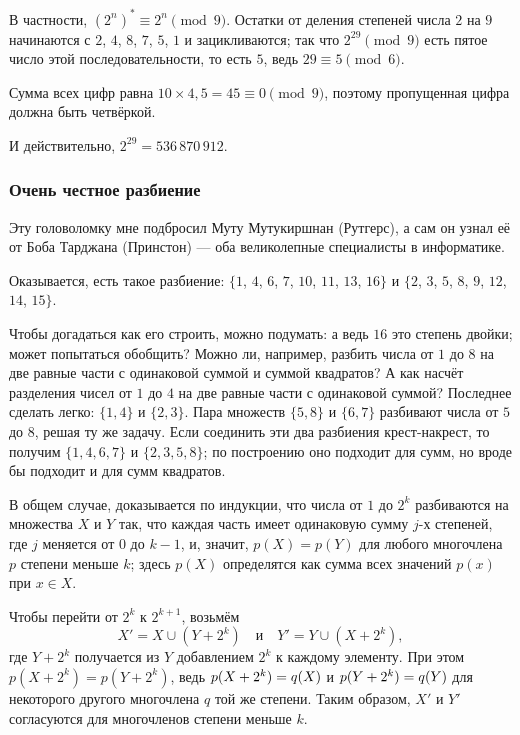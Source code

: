 В частности, $(2^n)^* \equiv 2^n \pmod 9$.
Остатки от деления степеней числа $2$ на $9$ начинаются с $2$, $4$, $8$, $7$, $5$, $1$ и зацикливаются;
так что $2^{29} \pmod 9$ есть пятое число этой последовательности, то есть $5$, ведь $29 \equiv 5 \pmod 6$.

Сумма всех цифр равна $10 \times 4{,}5 = 45 \equiv 0 \pmod 9$, поэтому пропущенная цифра должна быть четвёркой.

И действительно, $2^{29} = 536\,870\,912$.

\subsubsection*{Очень честное разбиение}

Эту головоломку мне подбросил Муту Мутукиршнан (Рутгерс),
а сам он узнал её от Боба Тарджана (Принстон) — 
оба великолепные специалисты в информатике.

Оказывается, есть такое разбиение: $\{1$, $4$, $6$, $7$, $10$, $11$, $13$, $16\}$ и $\{2$, $3$, $5$, $8$, $9$, $12$, $14$, $15\}$.

Чтобы догадаться как его строить, можно подумать:
а ведь $16$ это степень двойки;
может попытаться обобщить?
Можно ли, например, разбить числа от $1$ до $8$ на две равные части с одинаковой суммой и суммой квадратов?
А как насчёт разделения чисел от $1$ до $4$ на две равные части с одинаковой суммой?
Последнее сделать легко: $\{1, 4\}$ и $\{2, 3\}$.
Пара множеств $\{5, 8\}$ и $\{6, 7\}$ разбивают числа от $5$ до $8$, решая ту же задачу.
Если соединить эти два разбиения крест-накрест, то получим $\{1, 4, 6, 7\}$ и $\{2, 3, 5, 8\}$; по построению оно подходит для сумм, но вроде бы подходит и для сумм квадратов.

В общем случае, доказывается по индукции, что числа от $1$ до $2^k$ разбиваются на множества $X$ и $Y$ так, что каждая часть имеет одинаковую сумму $j$-х степеней, где $j$ меняется от $0$ до $k - 1$, и, значит, $p(X)=p(Y)$ для любого многочлена $p$ степени меньше $k$;
здесь $p(X)$ определятся как сумма всех значений $p(x)$ при $x \in X$.

Чтобы перейти от $2^{k}$ к $2^{k+1}$, возьмём 
\[X' = X \cup (Y + 2^k)\quad\text{и}\quad Y' = Y \cup (X + 2^k),\]
где $Y + 2^k$ получается из $Y$ добавлением $2^k$ к каждому элементу.
При этом $p(X + 2^k) = p(Y + 2^k)$,
ведь $p(X + 2^k)\z=q(X)$ и $p(Y + 2^k)\z=q(Y)$ для некоторого другого многочлена $q$ той же степени.
Таким образом, $X'$ и $Y'$ согласуются для многочленов степени меньше $k$. 

